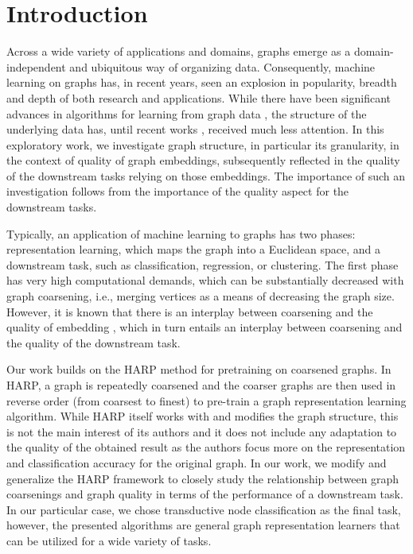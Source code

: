 \section{Introduction}
Across a wide variety of applications and domains, graphs emerge as a domain-independent and ubiquitous way of organizing data. Consequently, machine learning on graphs has, in recent years, seen an explosion in popularity, breadth and depth of both research and applications. While there have been significant advances in algorithms for learning from graph data \cite{defferrard_convolutional_2016, kipf_semi-supervised_2017}, the structure of the underlying data has, until recent works \cite{topping_understanding_2021, velickovic_geometric_2021}, received much less attention. In this exploratory work, we investigate graph structure, in particular its granularity, in the context of quality of graph embeddings, subsequently reflected in the quality of the downstream tasks relying on those embeddings. The importance of such an investigation follows from the importance of the quality aspect for the downstream tasks.

Typically, an application of machine learning to graphs has two phases: representation learning, which maps the graph into a Euclidean space, and a downstream task, such as classification, regression, or clustering. The first phase has very high computational demands, which can be substantially decreased with graph coarsening, i.e., merging vertices as a means of decreasing the graph size. However, it is known that there is an interplay between coarsening and the quality of embedding \cite{akyildiz_understanding_2020, makarov_survey_2021}, which in turn entails an interplay between coarsening and the quality of the downstream task.

Our work builds on the HARP \cite{chen_harp_2018} method for pretraining on coarsened graphs. In HARP, a graph is repeatedly coarsened and the coarser graphs are then used in reverse order (from coarsest to finest) to pre-train a graph representation learning algorithm. While HARP itself works with and modifies the graph structure, this is not the main interest of its authors and it does not include any adaptation to the quality of the obtained result as the authors focus more on the representation and classification accuracy for the original graph. In our work, we modify and generalize the HARP framework to closely study the relationship between graph coarsenings and graph quality in terms of the performance of a downstream task. In our particular case, we chose transductive node classification as the final task, however, the presented algorithms are general graph representation learners that can be utilized for a wide variety of tasks.

